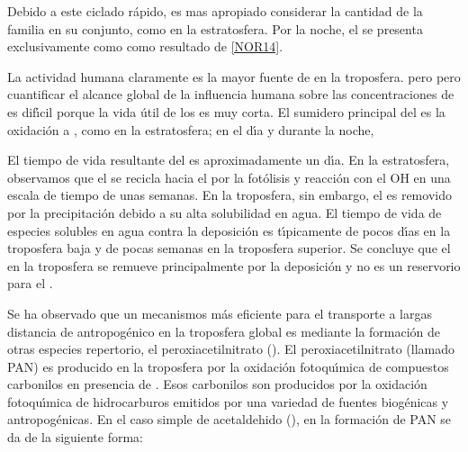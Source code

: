 Debido a este ciclado r\'apido, es mas apropiado considerar la cantidad de la familia   en su conjunto, como en la estratosfera. Por la noche, el   se presenta exclusivamente como  como resultado de \ref{NOR14}.

La actividad humana claramente es la mayor fuente de  en la troposfera. pero  pero cuantificar el alcance global de la influencia humana sobre las concentraciones de  es dif\'{\i}cil porque la vida \'util de los  es muy corta. El sumidero principal del  es la oxidaci\'on a , como en la estratosfera; en el d\'{\i}a 
y durante la noche,

El tiempo de vida resultante del  es aproximadamente un d\'{\i}a. En la estratosfera, observamos que el  se recicla hacia el  por la fot\'olisis y reacci\'on con el OH en una escala de tiempo de unas semanas. En la troposfera, sin embargo, el  es removido por la precipitaci\'on debido a su alta solubilidad en agua. El tiempo de vida de especies solubles en agua contra la deposici\'on es t\'{\i}picamente de pocos d\'{\i}as en la troposfera baja y de pocas semanas en la troposfera superior. Se concluye que el  en la troposfera se remueve principalmente por la deposici\'on y no es un reservorio para el .

Se ha observado que un mecanismos m\'as eficiente para el transporte a largas distancia de  antropog\'enico en la troposfera global es mediante la formaci\'on de otras especies repertorio, el peroxiacetilnitrato (). El peroxiacetilnitrato (llamado PAN) es producido en la troposfera por la oxidaci\'on fotoqu\'{\i}mica de compuestos carbonilos en presencia de . Esos carbonilos son producidos por la oxidaci\'on fotoqu\'{\i}mica de hidrocarburos emitidos por una variedad de fuentes biog\'enicas y antropog\'enicas. En el caso simple de acetaldehido (), en la formaci\'on de PAN se da de la siguiente forma:


